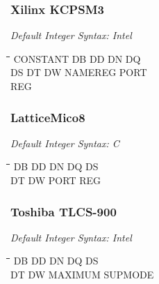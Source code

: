 \subsubsection{Xilinx KCPSM3}

{\em Default Integer Syntax: Intel}

{\tt\begin{tabbing}
\hspace{3cm}\=\hspace{3cm}\=\hspace{3cm}\=\hspace{3cm}\=\kill
CONSTANT   \> DB         \> DD          \> DN          \> DQ \\
DS         \> DT         \> DW          \> NAMEREG     \> PORT \\
REG \\
\end{tabbing}}

\subsubsection{LatticeMico8}

{\em Default Integer Syntax: C}

{\tt\begin{tabbing}
\hspace{3cm}\=\hspace{3cm}\=\hspace{3cm}\=\hspace{3cm}\=\kill
DB         \> DD          \> DN         \> DQ          \> DS \\
DT         \> DW          \> PORT       \> REG \\
\end{tabbing}}

\subsubsection{Toshiba TLCS-900}

{\em Default Integer Syntax: Intel}

{\tt\begin{tabbing}
\hspace{3cm}\=\hspace{3cm}\=\hspace{3cm}\=\hspace{3cm}\=\kill
DB         \> DD          \> DN         \> DQ          \> DS \\
DT         \> DW          \> MAXIMUM    \> SUPMODE \\
\end{tabbing}}

